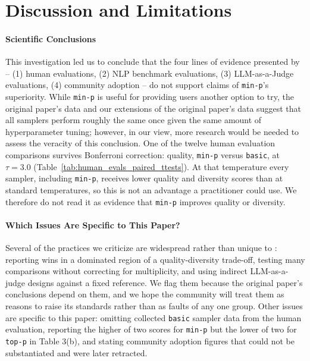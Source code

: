 \section{Discussion and Limitations}
\label{sec:discussion}

\paragraph{Scientific Conclusions} This investigation led us to conclude that the four lines of evidence presented by \citet{nguyen2024minp} -- (1) human evaluations, (2) NLP benchmark evaluations, (3) LLM-as-a-Judge evaluations, (4) community adoption -- do not support claims of \texttt{min-p}'s superiority.
While \texttt{min-p} is useful for providing users another option to try, the original paper's data and our extensions of the original paper's data suggest that all samplers perform roughly the same once given the same amount of hyperparameter tuning; however, in our view, more research would be needed to assess the veracity of this conclusion.
One of the twelve human evaluation comparisons survives Bonferroni correction: quality, \texttt{min-p} versus \texttt{basic}, at $\tau=3.0$ (Table~\ref{tab:human_evals_paired_ttests}). At that temperature every sampler, including \texttt{min-p}, receives lower quality and diversity scores than at standard temperatures, so this is not an advantage a practitioner could use. We therefore do not read it as evidence that \texttt{min-p} improves quality or diversity.

\paragraph{Which Issues Are Specific to This Paper?} Several of the practices we criticize are widespread rather than unique to \citet{nguyen2024minp}: reporting wins in a dominated region of a quality-diversity trade-off, testing many comparisons without correcting for multiplicity, and using indirect LLM-as-a-judge designs against a fixed reference. We flag them because the original paper's conclusions depend on them, and we hope the community will treat them as reasons to raise its standards rather than as faults of any one group. Other issues are specific to this paper: omitting collected \texttt{basic} sampler data from the human evaluation, reporting the higher of two scores for \texttt{min-p} but the lower of two for \texttt{top-p} in Table 3(b), and stating community adoption figures that could not be substantiated and were later retracted.

